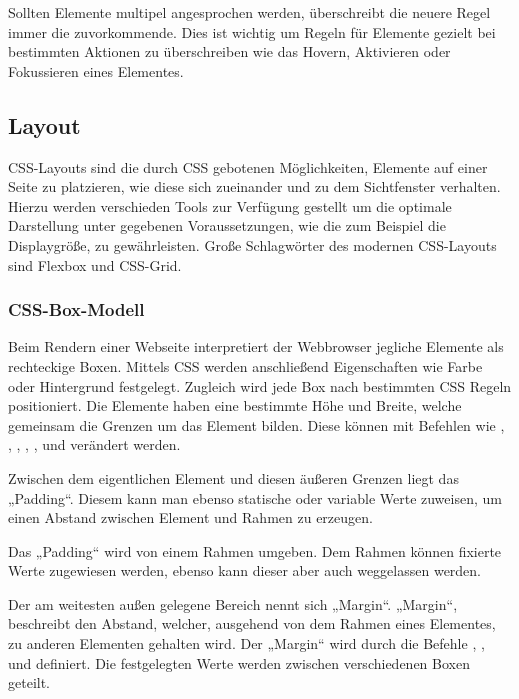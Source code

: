 Sollten Elemente multipel angesprochen werden, überschreibt die neuere Regel immer die zuvorkommende. Dies ist wichtig um Regeln für Elemente gezielt bei bestimmten Aktionen zu überschreiben wie das Hovern, Aktivieren oder Fokussieren eines Elementes.

\subsection{Layout}
CSS-Layouts\cite{CSSLayout} sind die durch CSS gebotenen Möglichkeiten, Elemente auf einer Seite zu platzieren, wie diese sich zueinander und zu dem Sichtfenster verhalten. Hierzu werden verschieden Tools zur Verfügung gestellt um die optimale Darstellung unter gegebenen Voraussetzungen, wie die zum Beispiel die Displaygröße, zu gewährleisten. Große Schlagwörter des modernen CSS-Layouts sind Flexbox und CSS-Grid.

\subsubsection{CSS-Box-Modell}
Beim Rendern einer Webseite interpretiert der Webbrowser jegliche Elemente als rechteckige Boxen\cite{BoxModel}. Mittels CSS werden anschließend Eigenschaften wie Farbe oder Hintergrund festgelegt. Zugleich wird jede Box nach bestimmten CSS Regeln positioniert. Die Elemente haben eine bestimmte Höhe und Breite, welche gemeinsam die Grenzen um das Element bilden. Diese können mit Befehlen wie , , , , , und  verändert werden.

Zwischen dem eigentlichen Element und diesen äußeren Grenzen liegt das „Padding“. Diesem kann man ebenso statische oder variable Werte zuweisen, um einen Abstand zwischen Element und Rahmen zu erzeugen.

Das „Padding“ wird von einem Rahmen umgeben. Dem Rahmen können fixierte Werte zugewiesen werden, ebenso kann dieser aber auch weggelassen werden.

Der am weitesten außen gelegene Bereich nennt sich „Margin“. „Margin“, beschreibt den Abstand, welcher, ausgehend von dem Rahmen eines Elementes, zu anderen Elementen gehalten wird. Der „Margin“ wird durch die Befehle , ,  und  definiert. Die festgelegten Werte werden zwischen verschiedenen Boxen geteilt.


